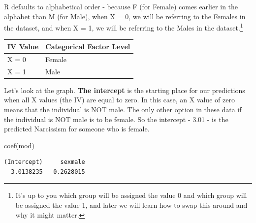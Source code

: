 \documentclass[
  letterpaper,
  DIV=11,
  numbers=noendperiod,
  oneside]{scrreprt}
\newenvironment{Shaded}{\begin{snugshade}}{\end{snugshade}}
\newcommand{\AttributeTok}[1]{\textcolor[rgb]{0.40,0.45,0.13}{#1}}
\newcommand{\DecValTok}[1]{\textcolor[rgb]{0.68,0.00,0.00}{#1}}
\newcommand{\FunctionTok}[1]{\textcolor[rgb]{0.28,0.35,0.67}{#1}}
\newcommand{\NormalTok}[1]{\textcolor[rgb]{0.00,0.23,0.31}{#1}}
\newcommand{\SpecialCharTok}[1]{\textcolor[rgb]{0.37,0.37,0.37}{#1}}
\newcommand{\StringTok}[1]{\textcolor[rgb]{0.13,0.47,0.30}{#1}}
\begin{document}
R defaults to alphabetical order - because F (for Female) comes earlier
in the alphabet than M (for Male), when X = 0, we will be referring to
the Females in the dataset, and when X = 1, we will be referring to the
Males in the dataset.\footnote{It's up to you which group will be
  assigned the value 0 and which group will be assigned the value 1, and
  later we will learn how to swap this around and why it might matter.}

\begin{longtable}[]{@{}ll@{}}
\toprule\noalign{}
IV Value & Categorical Factor Level \\
\midrule\noalign{}
\endhead
\bottomrule\noalign{}
\endlastfoot
X = 0 & Female \\
X = 1 & Male \\
\end{longtable}

Let's look at the graph. \textbf{The intercept} is the starting place
for our predictions when all X values (the IV) are equal to zero. In
this case, an X value of zero means that the individual is NOT male. The
only other option in these data if the individual is NOT male is to be
female. So the intercept - 3.01 - is the predicted Narcissism for
someone who is female.

\begin{Shaded}
\begin{Highlighting}[]
\FunctionTok{coef}\NormalTok{(mod)}
\end{Highlighting}
\end{Shaded}

\begin{verbatim}
(Intercept)     sexmale 
  3.0138235   0.2628015 
\end{verbatim}

\begin{Shaded}
\end{Shaded}
\end{document}
